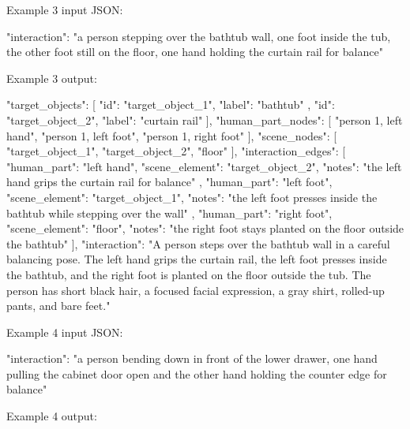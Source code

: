 \begin{promptblock}
Example 3 input JSON:

{
  "interaction": "a person stepping over the bathtub wall, one foot inside the tub, the other foot still on the floor, one hand holding the curtain rail for balance"
}

Example 3 output:

{
  "target_objects": [
    {
      "id": "target_object_1",
      "label": "bathtub"
    },
    {
      "id": "target_object_2",
      "label": "curtain rail"
    }
  ],
  "human_part_nodes": [
    "person 1, left hand",
    "person 1, left foot",
    "person 1, right foot"
  ],
  "scene_nodes": [
    "target_object_1",
    "target_object_2",
    "floor"
  ],
  "interaction_edges": [
    {
      "human_part": "left hand",
      "scene_element": "target_object_2",
      "notes": "the left hand grips the curtain rail for balance"
    },
    {
      "human_part": "left foot",
      "scene_element": "target_object_1",
      "notes": "the left foot presses inside the bathtub while stepping over the wall"
    },
    {
      "human_part": "right foot",
      "scene_element": "floor",
      "notes": "the right foot stays planted on the floor outside the bathtub"
    }
  ],
  "interaction": "A person steps over the bathtub wall in a careful balancing pose. The left hand grips the curtain rail, the left foot presses inside the bathtub, and the right foot is planted on the floor outside the tub. The person has short black hair, a focused facial expression, a gray shirt, rolled-up pants, and bare feet."
}

Example 4 input JSON:

{
  "interaction": "a person bending down in front of the lower drawer, one hand pulling the cabinet door open and the other hand holding the counter edge for balance"
}

Example 4 output:


\end{promptblock}
